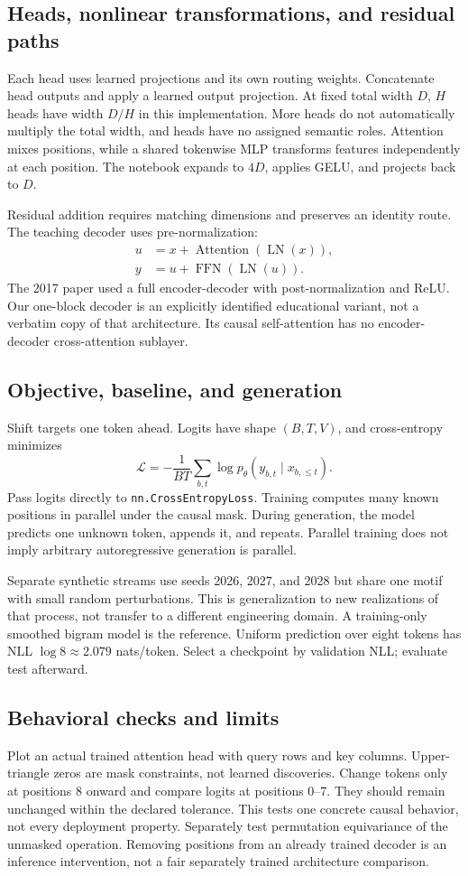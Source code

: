\subsection{Heads, nonlinear transformations, and residual paths}
Each head uses learned projections and its own routing weights. Concatenate
head outputs and apply a learned output projection. At fixed total width
$D$, $H$ heads have width $D/H$ in this implementation. More heads do not
automatically multiply the total width, and heads have no assigned semantic
roles. Attention mixes positions, while a shared tokenwise MLP transforms
features independently at each position. The notebook expands to $4D$,
applies GELU, and projects back to $D$.

Residual addition requires matching dimensions and preserves an identity
route. The teaching decoder uses pre-normalization:
\begin{align*}
u&=x+\operatorname{Attention}(\operatorname{LN}(x)),\\
y&=u+\operatorname{FFN}(\operatorname{LN}(u)).
\end{align*}
The 2017 paper used a full encoder-decoder with post-normalization and
ReLU. Our one-block decoder is an explicitly identified educational
variant, not a verbatim copy of that architecture. Its causal self-attention
has no encoder-decoder cross-attention sublayer.

\subsection{Objective, baseline, and generation}
Shift targets one token ahead. Logits have shape $(B,T,V)$, and
cross-entropy minimizes
\[\mathcal L=-\frac1{BT}\sum_{b,t}\log p_\theta(y_{b,t}\mid x_{b,\le t}).\]
Pass logits directly to \texttt{nn.CrossEntropyLoss}. Training computes
many known positions in parallel under the causal mask. During generation,
the model predicts one unknown token, appends it, and repeats. Parallel
training does not imply arbitrary autoregressive generation is parallel.

Separate synthetic streams use seeds 2026, 2027, and 2028 but share one
motif with small random perturbations. This is generalization to new
realizations of that process, not transfer to a different engineering
domain. A training-only smoothed bigram model is the reference. Uniform
prediction over eight tokens has NLL $\log 8\approx2.079$ nats/token.
Select a checkpoint by validation NLL; evaluate test afterward.

\subsection{Behavioral checks and limits}
Plot an actual trained attention head with query rows and key columns.
Upper-triangle zeros are mask constraints, not learned discoveries.
Change tokens only at positions 8 onward and compare logits at positions
0--7. They should remain unchanged within the declared tolerance.
This tests one concrete causal behavior, not every deployment property.
Separately test permutation equivariance of the unmasked operation.
Removing positions from an already trained decoder is an inference
intervention, not a fair separately trained architecture comparison.

